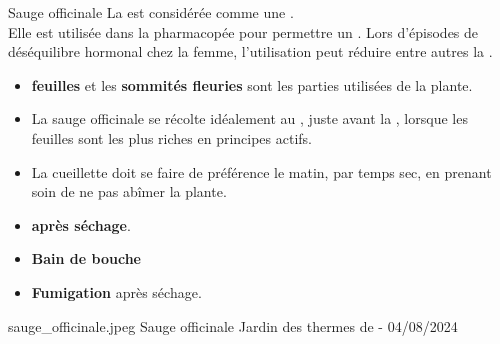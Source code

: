 \ficheidentiteplantelong
{Sauge officinale}
{%
    La  est considérée comme une .\\ 
    Elle est utilisée dans la pharmacopée pour permettre un .
}
{%
    Lors d'épisodes de déséquilibre hormonal chez la femme, l'utilisation peut réduire entre autres la . 
}
{%
    \begin{itemize}[label = \bcplume]
        \item \textbf{feuilles} et les \textbf{sommités fleuries} sont les parties utilisées de la plante.
        \item La sauge officinale se récolte idéalement au , juste avant la , lorsque les feuilles sont les plus riches en principes actifs. 
        \item La cueillette doit se faire de préférence le matin, par temps sec, en prenant soin de ne pas abîmer la plante.
        \item  \textbf{après séchage}.
    \end{itemize}
}
{%
    \begin{itemize}[label = \bcplume]
        \item \textbf{Bain de bouche}
        \item \textbf{Fumigation} après séchage.
    \end{itemize}
}
{%
\begin{multicols}{2}


    \columnbreak


\end{multicols}
}
{%
    sauge_officinale.jpeg
}
{%
    Sauge officinale
}
{%
    Jardin des thermes de  - 04/08/2024 
}

